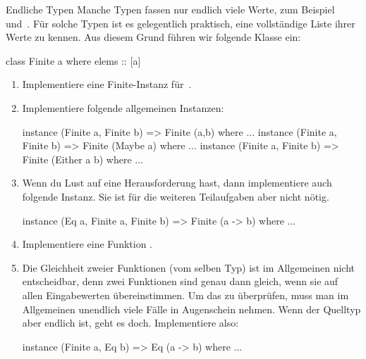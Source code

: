 \documentclass{uebblatt}
\begin{document}
\begin{aufgabe}{Endliche Typen}
Manche Typen fassen nur endlich viele Werte, zum Beispiel~
und~. Für solche Typen ist es gelegentlich
praktisch, eine vollständige Liste ihrer Werte zu kennen. Aus diesem Grund
führen wir folgende Klasse ein:
\begin{haskellcode}
class Finite a where
    elems :: [a]
\end{haskellcode}
\begin{enumerate}
\item Implementiere eine Finite-Instanz für~.
\item Implementiere folgende allgemeinen Instanzen:
\begin{haskellcode}
instance (Finite a, Finite b) => Finite (a,b)        where ...
instance (Finite a, Finite b) => Finite (Maybe a)    where ...
instance (Finite a, Finite b) => Finite (Either a b) where ...
\end{haskellcode}
\item Wenn du Lust auf eine Herausforderung hast, dann implementiere auch
folgende Instanz. Sie ist für die weiteren Teilaufgaben aber nicht nötig.
\begin{haskellcode}
instance (Eq a, Finite a, Finite b) => Finite (a -> b) where ...
\end{haskellcode}
\item Implementiere eine Funktion .
\item Die Gleichheit zweier Funktionen (vom selben Typ) ist im Allgemeinen
nicht entscheidbar, denn zwei Funktionen sind genau dann gleich, wenn sie auf
allen Eingabewerten übereinstimmen. Um das zu überprüfen, muss man im
Allgemeinen unendlich viele Fälle in Augenschein nehmen. Wenn der Quelltyp aber
endlich ist, geht es doch. Implementiere also:
\begin{haskellcode}
instance (Finite a, Eq b) => Eq (a -> b) where ...
\end{haskellcode}
\end{enumerate}
\end{aufgabe}
\end{document}
